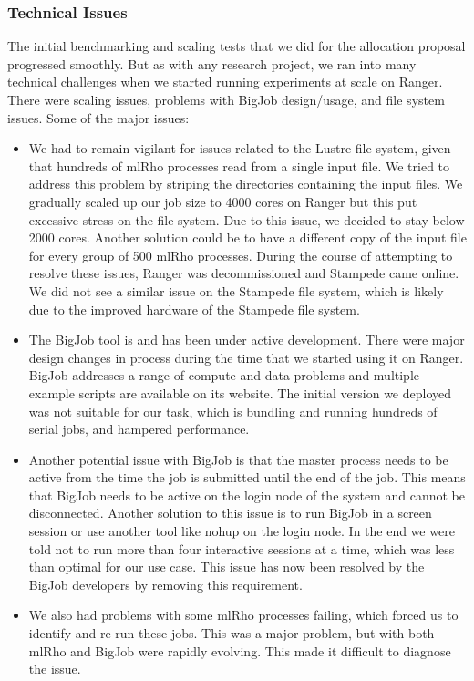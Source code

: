 \documentclass{sig-alternate}
\begin{document}
\subsubsection{Technical Issues }

The initial benchmarking and scaling tests that we did for the allocation proposal progressed smoothly. But as with any research project, we ran into many technical challenges when we started running experiments at scale on Ranger. There were scaling issues, problems with BigJob design/usage, and file system issues. Some of the major issues:
\begin{itemize}
\item We had to remain vigilant for issues related to the Lustre file system, given that hundreds of mlRho
  processes read from a single input file. We tried to address this problem by striping the directories
  containing the input files. We gradually scaled up our job size to 4000 cores on Ranger but this put excessive stress on the
  file system. Due to this issue, we decided to stay below 2000 cores. Another solution could be to have a
  different copy of the input file for every group of 500 mlRho processes. During the course of attempting to
  resolve these issues, Ranger was decommissioned and Stampede came online. We did not see a similar issue on
  the Stampede file system, which is likely due to the improved hardware of the Stampede file system.
\item The BigJob tool is and has been under active development. There were major design changes in process
  during the time that we started using it on Ranger. BigJob addresses a range of compute and data problems
  and multiple example scripts are available on its website. The initial version we deployed was not suitable for
  our task, which is bundling and running hundreds of serial jobs, and hampered performance. 
\item Another potential issue with BigJob is that the master process needs to be active from the time the job
  is submitted until the end of the job. This means that BigJob needs to be active on the login node of the
  system and cannot be disconnected. Another solution to this issue is to run BigJob in a screen session or use another
  tool like nohup on the login node. In the end we were told not to run more than four interactive sessions at a time, which was less than optimal for our use case. This issue has now been resolved by the BigJob developers by removing this requirement.
\item We also had problems with some mlRho processes failing, which forced us to identify and re-run
  these jobs. This was a major problem, but with both mlRho and BigJob were rapidly evolving. This made it difficult to diagnose the issue.

\end{itemize}
\end{document}
